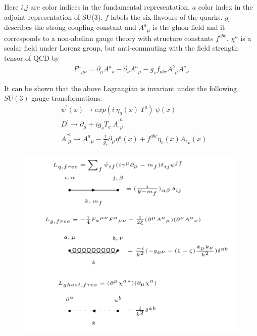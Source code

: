 Here $i$,$j$ are color indices in the fundamental representation, $a$  color index in the adjoint representation of SU(3). $f$ labels the six flavours of the quarks. $ g_s $ describes the strong coupling constant and $ {A^a}_{\mu} $ is the gluon field and it corresponds to a non-abelian gauge theory with structure constants $ f^{abc} $. $ {\chi^a} $ is a scalar field under Lorenz group, but anti-commuting with the field strength tensor of QCD  by \cite{Schwartz:2013pla, peskin2018introduction}
\begin{equation}
\begin{split}
{F^a}_{\mu \nu}= \partial_\mu {A^a}_{\nu}-\partial_\nu {A^a}_{\mu}-g_s f_{abc} {A^b}_{\mu} {A^c}_{\nu}
\end{split}
\end{equation}

\pagebreak
It can be shown that the above Lagrangian is invariant under the following $ SU(3) $ gauge transformations:
\begin{equation}
\begin{split}
&{\psi}^{\prime}(x) \rightarrow exp(i \:\eta_a(x) \:T^a) \:\psi(x)\\
&{D}^{\prime} \rightarrow \partial_\mu+ig_sT_a\: {{A}^{\prime}}^a_{\mu } \\
&{{A}^{\prime}}^a_{\mu }\rightarrow  {A^a}_{\mu}- \frac{1}{g_s}\partial_\mu \eta^a(x)+ f^{abc} \eta_{b}(x) {A_c}_{\nu}(x)
\end{split}
\end{equation}

\begin{figure}[h!]
\hspace{-1cm}
\includegraphics[scale=0.7]{images/Intro/Lfree.png}
\end{figure}

